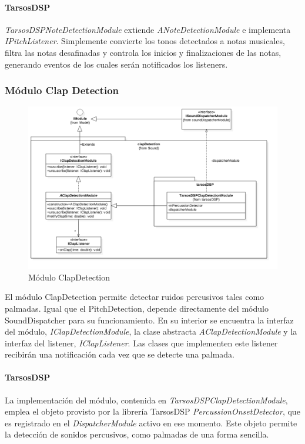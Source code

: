  \paragraph*{TarsosDSP\\}%
 
 \textit{TarsosDSPNoteDetectionModule} extiende \textit{ANoteDetectionModule} e implementa \textit{IPitchListener}. Simplemente convierte los tonos detectados a notas musicales, filtra las notas desafinadas y controla los inicios y finalizaciones de las notas, generando eventos de los cuales serán notificados los listeners.
\subsubsection{Módulo Clap Detection}
\begin{figure}
	\centering
	\includegraphics[width=1\linewidth]{imagenes/diagramas/ClapDetectionModule.png}
	\caption{Módulo ClapDetection}
	\label{fig:clap-detection-module}
\end{figure}
El módulo ClapDetection permite detectar ruidos percusivos tales como palmadas. Igual que el PitchDetection, depende directamente del módulo SoundDispatcher para su funcionamiento. En su interior se encuentra la interfaz del módulo, \textit{IClapDetectionModule}, la clase abstracta \textit{AClapDetectionModule} y la interfaz del listener, \textit{IClapListener}. Las clases que implementen este listener recibirán una notificación cada vez que se detecte una palmada.
\paragraph*{TarsosDSP\\} 
La implementación del módulo, contenida en \textit{TarsosDSPClapDetectionModule}, emplea el objeto provisto por la librería TarsosDSP \textit{PercussionOnsetDetector}, que es registrado en el \textit{DispatcherModule} activo en ese momento. Este objeto permite la detección de sonidos percusivos, como palmadas de una forma sencilla.

